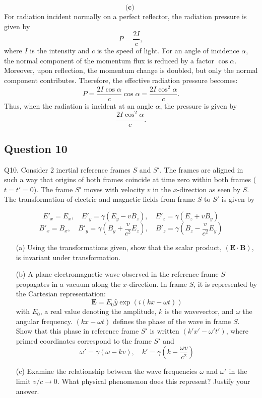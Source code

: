 \documentclass{article}
\begin{document}
\[
\textbf{(c) }
\]
For radiation incident normally on a perfect reflector, the radiation pressure is given by
\[
P = \frac{2I}{c},
\]
where \(I\) is the intensity and \(c\) is the speed of light. For an angle of incidence \(\alpha\), the normal component of the momentum flux is reduced by a factor \(\cos\alpha\). Moreover, upon reflection, the momentum change is doubled, but only the normal component contributes. Therefore, the effective radiation pressure becomes:
\[
P = \frac{2I\cos\alpha}{c}\cos\alpha = \frac{2I\cos^2\alpha}{c}.
\]
Thus, when the radiation is incident at an angle \(\alpha\), the pressure is given by
\[
\frac{2I\cos^2\alpha}{c}.
\]


\subsection{Question 10}
Q10. Consider 2 inertial reference frames \( S \) and \( S' \). The frames are aligned in such a way that origins of both frames coincide at time zero within both frames (\( t = t' = 0 \)). The frame \( S' \) moves with velocity \( v \) in the \( x \)-direction as seen by \( S \). The transformation of electric and magnetic fields from frame \( S \) to \( S' \) is given by 

\[
E'_x = E_x, \quad E'_y = \gamma (E_y - v B_z), \quad E'_z = \gamma (E_z + v B_y)
\]
\[
B'_x = B_x, \quad B'_y = \gamma \left( B_y + \frac{v}{c^2} E_z \right), \quad B'_z = \gamma \left( B_z - \frac{v}{c^2} E_y \right)
\]

\begin{enumerate}
    \item[(a)] Using the transformations given, show that the scalar product, \( (\mathbf{E} \cdot \mathbf{B}) \), is invariant under transformation.
    
    \item[(b)] A plane electromagnetic wave observed in the reference frame \( S \) propagates in a vacuum along the \( x \)-direction. In frame \( S \), it is represented by the Cartesian representation:
    \[
    \mathbf{E} = E_0 \hat{y} \exp \left( i (k x - \omega t) \right)
    \]
    with \( E_0 \), a real value denoting the amplitude, \( k \) is the wavevector, and \( \omega \) the angular frequency. \( (kx - \omega t) \) defines the phase of the wave in frame \( S \). Show that this phase in reference frame \( S' \) is written \( (k' x' - \omega' t') \), where primed coordinates correspond to the frame \( S' \) and 
    \[
    \omega' = \gamma (\omega - k v), \quad k' = \gamma \left( k - \frac{\omega v}{c^2} \right)
    \]

    \item[(c)] Examine the relationship between the wave frequencies \( \omega \) and \( \omega' \) in the limit \( v / c \to 0 \). What physical phenomenon does this represent? Justify your answer.
\end{enumerate}
\end{document}
